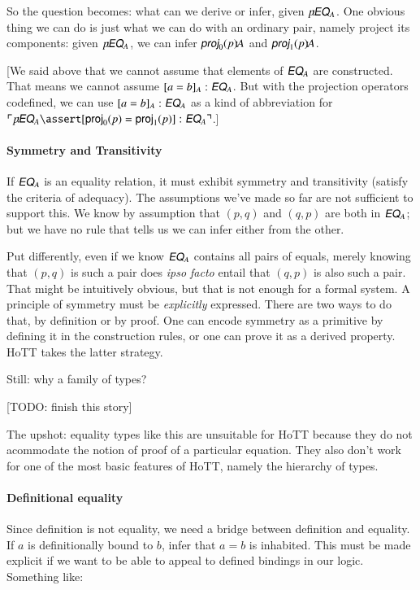 \documentclass{article}
\begin{document}
 So the question becomes: what can we derive or infer, given
 \(p\type\EQ_A\). One obvious thing we can do is just what we can do
 with an ordinary pair, namely project its components: given
 \(p\type\EQ_A\), we can infer \(\textsf{\slshape proj}_0(p)\type A\)
 and \(\textsf{\slshape proj}_1(p)\type A\).

[We said above that we cannot assume that elements of \(\EQ_A\) are
  constructed. That means we cannot assume \([a=b]_A:\EQ_A\). But with
  the projection operators codefined, we can use \([a=b]_A:\EQ_A\) as
  a kind of abbreviation for \(\ulcorner p\type \EQ_A\linfer
  [\textsf{proj}_0(p) = \textsf{proj}_1(p)]:\EQ_A\urcorner\).]

\paragraph{Symmetry and Transitivity}
If \(\EQ_A\) is an equality relation, it must exhibit symmetry and
transitivity (satisfy the criteria of adequacy). The assumptions we've
made so far are not sufficient to support this. We know by assumption
that \((p,q)\) and \((q,p)\) are both in \(\EQ_A\); but we have no
rule that tells us we can infer either from the other.

Put differently, even if we know \(\EQ_A\) contains all pairs of
equals, merely knowing that \((p,q)\) is such a pair does \textit{ipso
  facto} entail that \((q,p)\) is also such a pair. That might be
intuitively obvious, but that is not enough for a formal system. A
principle of symmetry must be \textit{explicitly} expressed. There are
two ways to do that, by definition or by proof. One can encode
symmetry as a primitive by defining it in the construction rules, or
one can prove it as a derived property. HoTT takes the latter
strategy.

Still: why a family of types?

[TODO: finish this story]

The upshot: equality types like this are unsuitable for HoTT because
they do not acommodate the notion of proof of a particular equation.
They also don't work for one of the most basic features of HoTT,
namely the hierarchy of types.

\paragraph{Definitional equality}

Since definition is not equality, we need a bridge between definition
and equality. If \(a\) is definitionally bound to \(b\), infer that
\(a=b\) is inhabited. This must be made explicit if we want to be able
to appeal to defined bindings in our logic. Something like:
\end{document}
